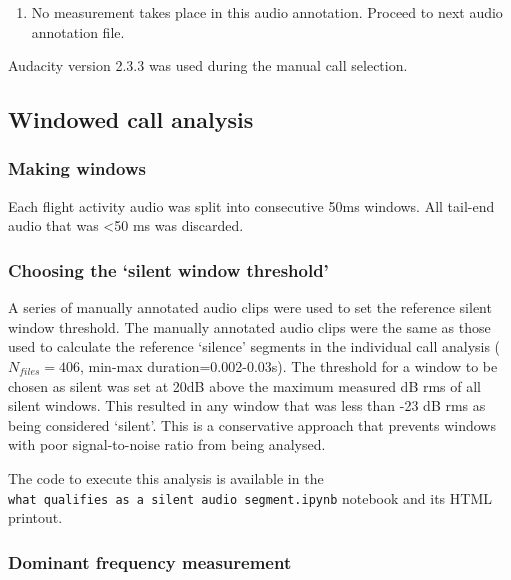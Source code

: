 \documentclass[
]{book}
\providecommand{\tightlist}{%
  \setlength{\itemsep}{0pt}\setlength{\parskip}{0pt}}
\begin{document}
\begin{itemize}
\begin{enumerate}
\begin{enumerate}
      \begin{enumerate}
      \def\labelenumiii{\roman{enumiii}.}
      \tightlist
      \item
        No measurement takes place in this audio annotation. Proceed to next audio annotation file.
      \end{enumerate}
    \end{enumerate}
  \end{enumerate}
\end{itemize}

Audacity version 2.3.3 was used during the manual call selection.

\hypertarget{windowed-call-analysis-2}{%
\subsection{Windowed call analysis}\label{windowed-call-analysis-2}}

\hypertarget{windowdetails}{%
\subsubsection{Making windows}\label{windowdetails}}

Each flight activity audio was split into consecutive 50ms windows. All tail-end audio that was \textless50 ms was discarded.

\hypertarget{silentwindow}{%
\subsubsection{Choosing the `silent window threshold'}\label{silentwindow}}

A series of manually annotated audio clips were used to set the reference silent window threshold. The manually annotated audio clips were the same as those used to calculate the reference `silence' segments in the individual call analysis (\(N_{files}=406\), min-max duration=0.002-0.03s). The threshold for a window to be chosen as silent was set at 20dB above the maximum measured dB rms of all silent windows. This resulted in any window that was less than -23 dB rms as being considered `silent'. This is a conservative approach that prevents windows with poor signal-to-noise ratio from being analysed.

The code to execute this analysis is available in the \texttt{what\ qualifies\ as\ a\ silent\ audio\ segment.ipynb} notebook and its HTML printout.

\hypertarget{domfreqdetails}{%
\subsubsection{Dominant frequency measurement}\label{domfreqdetails}}
\end{document}
